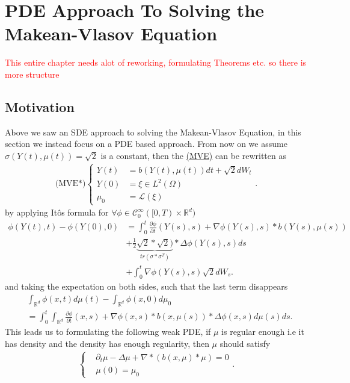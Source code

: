 \chapter{PDE Approach To Solving the Makean-Vlasov Equation}
\textcolor{Red}{This entire chapter needs alot of reworking, formulating Theorems etc. so there is more structure}
\section{Motivation}
Above we saw an SDE approach to solving the Makean-Vlasov Equation, in this section we instead focus on a PDE based approach.
From now on we assume $\sigma(Y(t),\mu(t)) = \sqrt{2} $ is a constant, then the \hyperref[MVE]{(MVE)} can be rewritten as
 \begin{align*}
   \text{(MVE*)}\begin{cases}
    Y(t) &= b(Y(t),\mu(t)) dt + \sqrt{2} dW_t\\
    Y(0) &= \xi \in  L^{2}(\Omega ) \\
    \mu_0 &= \mathcal{L}(\xi)
   \end{cases}
 .\end{align*}
 by applying It\^os formula for $\forall \phi  \in  \mathcal{C}_0^{\infty}([0,T)\times \mathbb{R}^{d} ) $
\begin{align*}
  \phi(Y(t),t) - \phi(Y(0),0) &= \int_0^{t} \frac{\partial \phi }{\partial t}(Y(s),s) + \nabla \phi(Y(s),s)*b(Y(s),\mu(s))  \\
                              &+ \frac{1}{2} \underbrace{\sqrt{2}*\sqrt{2})}_{tr(\sigma *\sigma ^{T} )}* \Delta \phi(Y(s),s) ds \\
                              &+ \int_0^{t} \nabla \phi(Y(s),s)  \sqrt{2} dW_s 
.\end{align*}
and taking the expectation  on both sides, such that the last term disappears 
\begin{align*}
  &\int_{\mathbb{R}^{d} } \phi(x,t) d\mu(t) - \int_{\mathbb{R}^{d} } \phi(x,0) d\mu_0 \\
  &= \int_0^{t} \int_{\mathbb{R}^{d} } \frac{\partial \phi }{\partial t}(x,s) + \nabla \phi(x,s)*b(x,\mu(s))* \Delta \phi(x,s)  d\mu(s) ds
.\end{align*}
This leads us to formulating the following weak PDE, if $\mu$ is regular enough i.e it has density and the density has enough regularity, then $\mu $ should satisfy 
\begin{align*}
  \begin{cases}
    &\partial_t \mu  - \Delta \mu  + \nabla * (b(x,\mu) * \mu )  =0\\
    &\mu(0) = \mu_0
  \end{cases}
.\end{align*}
